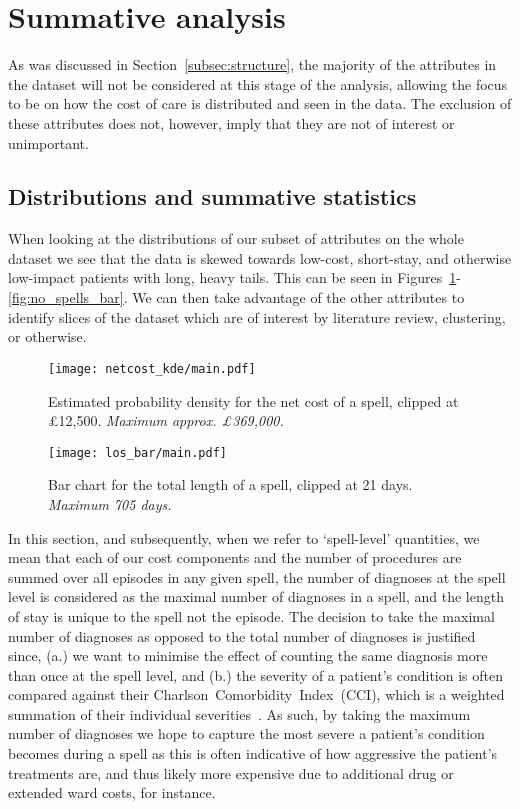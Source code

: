 \section{Summative analysis}\label{sec:summative}

As was discussed in Section~\ref{subsec:structure}, the majority of the
attributes in the dataset will not be considered at this stage of the analysis,
allowing the focus to be on how the cost of care is distributed and seen in the
data. The exclusion of these attributes does not, however, imply that they are
not of interest or unimportant.

\subsection{Distributions and summative
statistics}\label{subsec:distributions_statistics}

When looking at the distributions of our subset of attributes on the whole
dataset we see that the data is skewed towards low-cost, short-stay, and
otherwise low-impact patients with long, heavy tails. This can be seen in
Figures~\ref{fig:netcost_kde}\--\ref{fig:no_spells_bar}. We can then take
advantage of the other attributes to identify slices of the dataset which are of
interest by literature review, clustering, or otherwise.

\begin{figure}[htbp]
    \centering
    \texttt{[image: netcost\_kde/main.pdf]}
    \caption{Estimated probability density for the net cost of a spell, clipped
        at \pounds12,500. \textit{Maximum approx.
        \pounds369,000.}}\label{fig:netcost_kde}
\end{figure}

\begin{figure}[htbp]
    \texttt{[image: los\_bar/main.pdf]}
    \caption{Bar chart for the total length of a spell, clipped at 21 days.
        \textit{Maximum 705 days.}}\label{fig:los_bar}
\end{figure}

In this section, and subsequently, when we refer to `spell-level' quantities, we
mean that each of our cost components and the number of procedures are summed
over all episodes in any given spell, the number of diagnoses at the spell level
is considered as the maximal number of diagnoses in a spell, and the length of
stay is unique to the spell not the episode. The decision to take the maximal
number of diagnoses as opposed to the total number of diagnoses is justified
since, (a.) we want to minimise the effect of counting the same diagnosis more
than once at the spell level, and (b.) the severity of a patient's condition is
often compared against their Charlson~Comorbidity~Index~(CCI), which is a
weighted summation of their individual severities~\cite{Thygesen2011}. As such,
by taking the maximum number of diagnoses we hope to capture the most severe a
patient's condition becomes during a spell as this is often indicative of how
aggressive the patient's treatments are, and thus likely more expensive due to
additional drug or extended ward costs, for instance.

